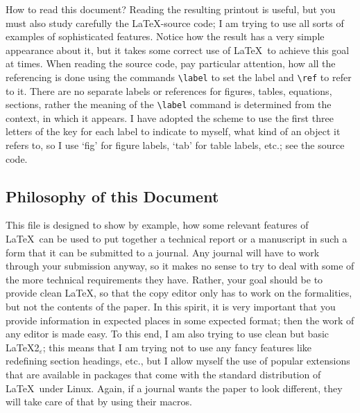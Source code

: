 \documentclass[12pt]{article}
\numberwithin{equation}{section}
\numberwithin{table}{section}
\numberwithin{figure}{section}
\begin{document}
How to read this document? Reading the resulting printout is useful,
but you must also study carefully the \LaTeX-source code;
I am trying to use all sorts of examples of sophisticated features.
Notice how the result has a very simple appearance about it, but it takes
some correct use of \LaTeX\ to achieve this goal at times.
When reading the source code, pay particular attention, how all the
referencing is done using the commands \verb+\label+ to set the label
and \verb+\ref+ to refer to it. There are no separate labels or references
for figures, tables, equations, sections, rather the meaning of the
\verb+\label+ command is determined from the context, in which it appears.
I have adopted the scheme to use the first three letters of the
key for each label to indicate to myself, what kind of an object it
refers to, so I use `fig' for figure labels, `tab' for table labels, etc.;
see the source code.

\subsection{Philosophy of this Document}

This file is designed to show by
example, how some relevant features of \LaTeX\ can be used to put
together a technical report or a manuscript
in such a form that it can be submitted to a journal.
Any journal will have to work through your submission anyway, so
it makes no sense to try to deal with some of the more technical
requirements they have. Rather, your goal should be to provide clean
\LaTeX, so that the copy editor only has to work on the formalities,
but not the contents of the paper. In this spirit, it is very important
that you provide information in expected places in some expected
format; then the work of any editor is made easy. To this end, I
am also trying to use clean but basic \LaTeX2$_\varepsilon$;
this means that I am trying not
to use any fancy features like redefining section headings,
etc., but I allow myself the use of popular extensions that
are available in packages that come with the standard distribution
of \LaTeX\ under Linux.
Again, if a journal wants the paper to look different,
they will take care of that by using their macros.
\end{document}
